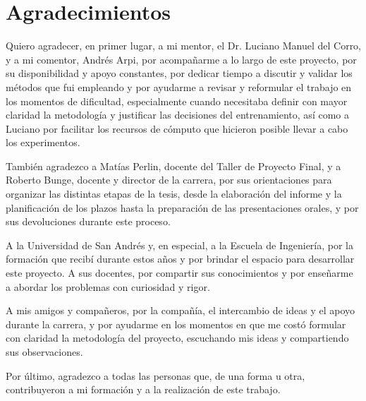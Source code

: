 \chapter*{Agradecimientos}
Quiero agradecer, en primer lugar, a mi mentor, el Dr. Luciano Manuel del Corro, y a mi comentor, Andrés Arpi, por acompañarme a lo largo de este proyecto, por su disponibilidad y apoyo constantes, por dedicar tiempo a discutir y validar los métodos que fui empleando y por ayudarme a revisar y reformular el trabajo en los momentos de dificultad, especialmente cuando necesitaba definir con mayor claridad la metodología y justificar las decisiones del entrenamiento, así como a Luciano por facilitar los recursos de cómputo que hicieron posible llevar a cabo los experimentos.

También agradezco a Matías Perlin, docente del Taller de Proyecto Final, y a Roberto Bunge, docente y director de la carrera, por sus orientaciones para organizar las distintas etapas de la tesis, desde la elaboración del informe y la planificación de los plazos hasta la preparación de las presentaciones orales, y por sus devoluciones durante este proceso.

A la Universidad de San Andrés y, en especial, a la Escuela de Ingeniería, por la formación que recibí durante estos años y por brindar el espacio para desarrollar este proyecto. A sus docentes, por compartir sus conocimientos y por enseñarme a abordar los problemas con curiosidad y rigor.

A mis amigos y compañeros, por la compañía, el intercambio de ideas y el apoyo durante la carrera, y por ayudarme en los momentos en que me costó formular con claridad la metodología del proyecto, escuchando mis ideas y compartiendo sus observaciones.

Por último, agradezco a todas las personas que, de una forma u otra, contribuyeron a mi formación y a la realización de este trabajo.
\clearpage
